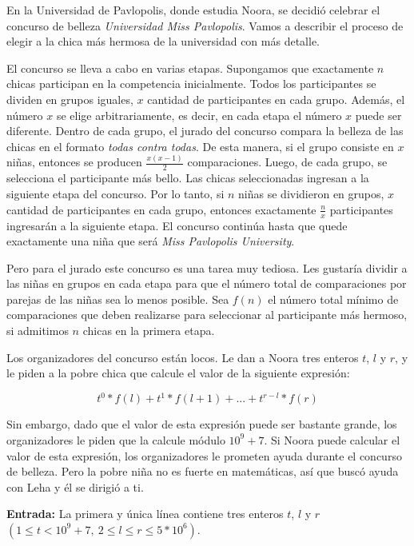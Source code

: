 \documentclass[12pt]{article}
\newcommand{\nl}{\vspace{0.3cm}}
\begin{document}
En la Universidad de Pavlopolis, donde estudia Noora, se decidió celebrar el concurso de belleza \textit{Universidad Miss Pavlopolis}. Vamos a describir el proceso de elegir a la chica más hermosa de la universidad con más detalle.

\nl

El concurso se lleva a cabo en varias etapas. Supongamos que exactamente $n$ chicas participan en la competencia inicialmente. Todos los participantes se dividen en grupos iguales, $x$ cantidad de participantes en cada grupo. Además, el número $x$ se elige arbitrariamente, es decir, en cada etapa el número $x$ puede ser diferente. Dentro de cada grupo, el jurado del concurso compara la belleza de las chicas en el formato \textit{todas contra todas}. De esta manera, si el grupo consiste en $x$ niñas, entonces se producen $\frac{x(x-1)}{2}$ comparaciones. Luego, de cada grupo, se selecciona el participante más bello. Las chicas seleccionadas ingresan a la siguiente etapa del concurso. Por lo tanto, si $n$ niñas se dividieron en grupos, $x$ cantidad de participantes en cada grupo, entonces exactamente $\frac{n}{x}$ participantes ingresarán a la siguiente etapa. El concurso continúa hasta que quede exactamente una niña que será \textit{Miss Pavlopolis University}.

\nl

Pero para el jurado este concurso es una tarea muy tediosa. Les gustaría dividir a las niñas en grupos en cada etapa para que el número total de comparaciones por parejas de las niñas sea lo menos posible. Sea $f(n)$ el número total mínimo de comparaciones que deben realizarse para seleccionar al participante más hermoso, si admitimos $n$ chicas en la primera etapa.

\nl

Los organizadores del concurso están locos. Le dan a Noora tres enteros $t$, $l$ y $r$, y le piden a la pobre chica que calcule el valor de la siguiente expresión:

$$ t^0 * f(l) + t^1 * f(l + 1) + ... + t^{r - l} * f(r) $$

Sin embargo, dado que el valor de esta expresión puede ser bastante grande, los organizadores le piden que la calcule módulo $10^9 + 7$. Si Noora puede calcular el valor de esta expresión, los organizadores le prometen ayuda durante el concurso de belleza. Pero la pobre niña no es fuerte en matemáticas, así que buscó ayuda con Leha y él se dirigió a ti.

\nl

\textbf{Entrada:} La primera y única línea contiene tres enteros $t$, $l$ y $r$ $(1 \leqslant t < 10^9 + 7,\ 2 \leqslant l \leqslant r \leqslant 5 * 10^6)$.
\end{document}
